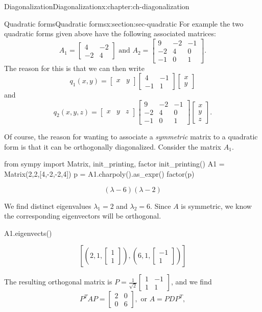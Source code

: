 \documentclass[oneside,10pt,]{book}
\numberwithin{equation}{section}
\newcommand{\bbm}{\begin{bmatrix}}
\newcommand{\ebm}{\end{bmatrix}}
\newcommand{\amp}{&}
\begin{document}
\begin{chapterptx}{Diagonalization}{}{Diagonalization}{}{}{x:chapter:ch-diagonalization}
\begin{sectionptx}{Quadratic forms}{}{Quadratic forms}{}{}{x:section:sec-quadratic}
For example the two quadratic forms given above have the following associated matrices:%
\begin{equation*}
A_1 = \bbm 4 \amp -2\\-2\amp 4\ebm \text{ and } A_2 = \bbm 9 \amp -2 \amp -1\\-2\amp 4\amp 0\\-1\amp 0\amp 1\ebm\text{.}
\end{equation*}
The reason for this is that we can then write%
\begin{equation*}
q_1(x,y)=\bbm x\amp y\ebm\bbm 4 \amp -1\\-1\amp 1\ebm\bbm x\\y\ebm
\end{equation*}
and%
\begin{equation*}
q_2(x,y,z)=\bbm x\amp y\amp z\ebm\bbm 9 \amp -2 \amp -1\\-2\amp 4\amp 0\\-1\amp 0\amp 1\ebm\bbm x\\y\\z\ebm\text{.}
\end{equation*}
%
\par
Of course, the reason for wanting to associate a \emph{symmetric} matrix to a quadratic form is that it can be orthogonally diagonalized. Consider the matrix \(A_1\).%
\begin{sageinput}
from sympy import Matrix, init_printing, factor
init_printing()
A1 = Matrix(2,2,[4,-2,-2,4])
p = A1.charpoly().as_expr()
factor(p)
\end{sageinput}
\begin{sageoutput}
\[(\lambda-6)(\lambda-2)\]
\end{sageoutput}
We find distinct eigenvalues \(\lambda_1=2\) and \(\lambda_2=6\). Since \(A\) is symmetric, we know the corresponding eigenvectors will be orthogonal.%
\begin{sageinput}
A1.eigenvects()
\end{sageinput}
\begin{sageoutput}
\[\left[\left(2,1,\bbm 1\\1\ebm\right),\left(6,1,\bbm -1\\1\ebm\right)\right]\]
\end{sageoutput}
The resulting orthogonal matrix is \(P=\frac{1}{\sqrt{2}}\bbm 1\amp -1\\1\amp 1\ebm\), and we find%
\begin{equation*}
P^TAP = \bbm 2\amp 0\\0\amp 6\ebm, \text{ or } A = PDP^T,

\end{equation*}
\end{sectionptx}
\end{chapterptx}
\end{document}
